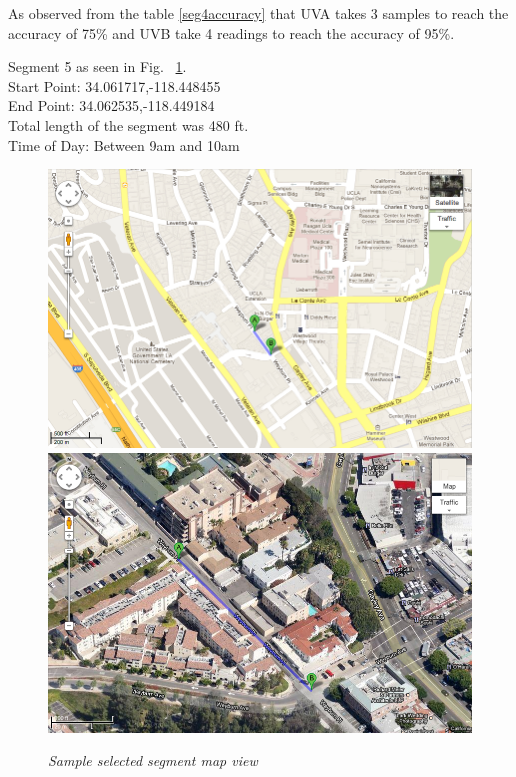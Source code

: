 \documentclass[12pt,fullpage,doublespace]{article}
\begin{document}
As observed from the table \ref{seg4accuracy} that UVA takes 3 samples to reach the accuracy of 75\% and UVB take 4 readings to reach the accuracy of 95\%. 
\newpage\newpage
\begin{center}
Segment 5 as seen in Fig. ~\ref{fig:segment5}. \\
Start Point:  34.061717,-118.448455\\
End Point:  34.062535,-118.449184 \\
Total length of the segment was 480 ft.\\
Time of Day: Between 9am and 10am\\
\begin{figure}[h]
\begin{center}
\includegraphics[scale=0.32]{segment5a.png}
\includegraphics[scale=0.32]{segment5b.png}
\caption{\small \sl Sample selected segment map view}\label{fig:segment5}
\end{center}
\end{figure}
\end{center}
\end{document}
